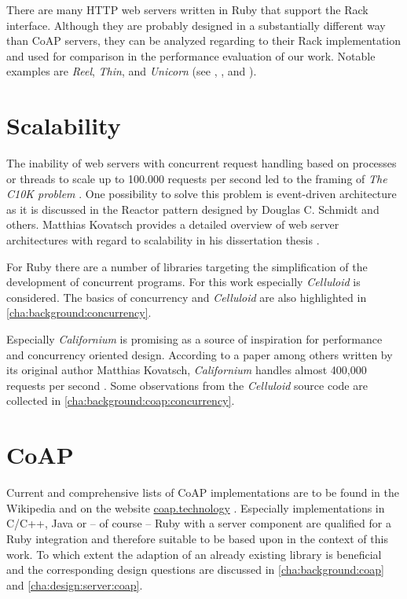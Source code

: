 	There are many \ac{HTTP} web servers written in Ruby that support the Rack
	interface. Although they are probably designed in a substantially different
	way than \ac{CoAP} servers, they can be analyzed regarding to their Rack
	implementation and used for comparison in the performance evaluation of our
	work. Notable examples are \emph{Reel}, \emph{Thin}, and \emph{Unicorn}
	(see \cite{reel}, \cite{thin}, and \cite{unicorn}).

\section{Scalability}

	The inability of web servers with concurrent request handling based on
	processes or threads to scale up to 100.000 requests per second led to the
	framing of \emph{The C10K problem} \cite{c10k}. One possibility to solve
	this problem is event-driven architecture as it is discussed in the Reactor
	pattern \cite{reactor-1} \cite{reactor-2} designed by Douglas C. Schmidt
	and others. Matthias Kovatsch provides a detailed overview of web server
	architectures with regard to scalability in his dissertation thesis
	 \cite{scalable-iot}.

	For Ruby there are a number of libraries targeting the simplification of
	the development of concurrent programs. For this work especially
	\emph{Celluloid} \cite{celluloid} is considered. The basics of concurrency
	and \emph{Celluloid} are also highlighted in
	\autoref{cha:background:concurrency}.

	Especially \emph{Californium} is promising as a source of inspiration for
	performance and concurrency oriented design. According to a paper among
	others written by its original author Matthias Kovatsch, \emph{Californium}
	handles almost 400,000 requests per second \cite{cf-scale}. Some
	observations from the \emph{Celluloid} source code are collected in
	\autoref{cha:background:coap:concurrency}.

\section{\acs{CoAP}}

	Current and comprehensive lists of \ac{CoAP} implementations are to be
	found in the Wikipedia \cite{coap-list-1} and on the website
	\href{http://coap.technology}{coap.technology} \cite{coap-list-2}.
	Especially implementations in C/C++, Java or -- of course -- Ruby with a
	server component are qualified for a Ruby integration and therefore
	suitable to be based upon in the context of this work. To which extent the
	adaption of an already existing library is beneficial and the corresponding
	design questions are discussed in \autoref{cha:background:coap} and
	\autoref{cha:design:server:coap}.

